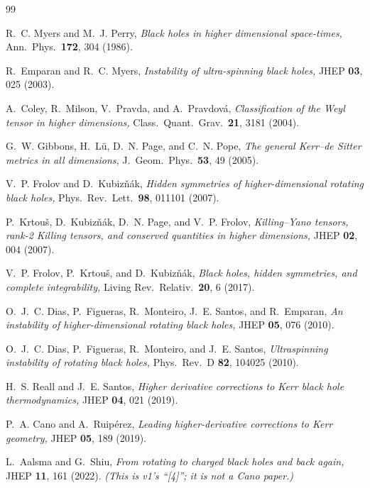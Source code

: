 \documentclass[11pt,a4paper]{article}
\begin{document}
\begin{thebibliography}{99}

R.~C. Myers and M.~J. Perry,
\emph{Black holes in higher dimensional space-times,}
Ann.\ Phys.\ \textbf{172}, 304 (1986).

R.~Emparan and R.~C. Myers,
\emph{Instability of ultra-spinning black holes,}
JHEP \textbf{03}, 025 (2003).

A.~Coley, R.~Milson, V.~Pravda, and A.~Pravdov\'a,
\emph{Classification of the Weyl tensor in higher dimensions,}
Class.\ Quant.\ Grav.\ \textbf{21}, 3181 (2004).

G.~W. Gibbons, H.~L\"u, D.~N. Page, and C.~N. Pope,
\emph{The general Kerr--de Sitter metrics in all dimensions,}
J.\ Geom.\ Phys.\ \textbf{53}, 49 (2005).

V.~P. Frolov and D.~Kubiz\v{n}\'ak,
\emph{Hidden symmetries of higher-dimensional rotating black holes,}
Phys.\ Rev.\ Lett.\ \textbf{98}, 011101 (2007).

P.~Krtou\v{s}, D.~Kubiz\v{n}\'ak, D.~N. Page, and V.~P. Frolov,
\emph{Killing--Yano tensors, rank-2 Killing tensors, and conserved
quantities in higher dimensions,}
JHEP \textbf{02}, 004 (2007).

V.~P. Frolov, P.~Krtou\v{s}, and D.~Kubiz\v{n}\'ak,
\emph{Black holes, hidden symmetries, and complete integrability,}
Living Rev.\ Relativ.\ \textbf{20}, 6 (2017).

O.~J.~C. Dias, P.~Figueras, R.~Monteiro, J.~E. Santos, and R.~Emparan,
\emph{An instability of higher-dimensional rotating black holes,}
JHEP \textbf{05}, 076 (2010).

O.~J.~C. Dias, P.~Figueras, R.~Monteiro, and J.~E. Santos,
\emph{Ultraspinning instability of rotating black holes,}
Phys.\ Rev.\ D \textbf{82}, 104025 (2010).

H.~S. Reall and J.~E. Santos,
\emph{Higher derivative corrections to Kerr black hole thermodynamics,}
JHEP \textbf{04}, 021 (2019).

P.~A. Cano and A.~Ruip\'erez,
\emph{Leading higher-derivative corrections to Kerr geometry,}
JHEP \textbf{05}, 189 (2019).

L.~Aalsma and G.~Shiu,
\emph{From rotating to charged black holes and back again,}
JHEP \textbf{11}, 161 (2022).
\emph{(This is v1's ``[4]''; it is not a Cano paper.)}


\end{thebibliography}
\end{document}
